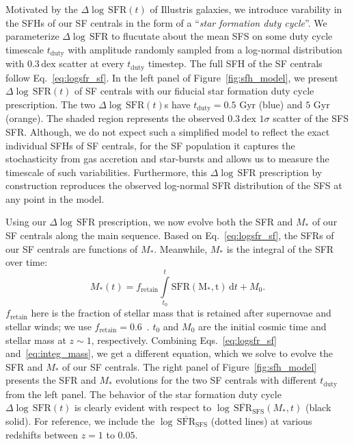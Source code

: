 \documentclass[12pt, letterpaper, preprint]{aastex}
\newcommand{\beq}{\begin{equation}}
\newcommand{\eeq}{\end{equation}}
\newcommand{\logsfr}{\log \, \mathrm{SFR}}
\newcommand{\musfms}{\log\,\overline{\mathrm{SFR}}_\mathrm{SFS}}
\begin{document}
Motivated by the $\Delta \logsfr(t)$ of Illustris galaxies, we introduce 
varability in the SFHs of our SF centrals in the form of a ``\emph{star 
formation duty cycle}''. We parameterize $\Delta \logsfr$ to flucutate about 
the mean SFS on some duty cycle timescale $t_\mathrm{duty}$ with amplitude
randomly sampled from a log-normal distribution with $0.3\,\mathrm{dex}$ 
scatter at every $t_\mathrm{duty}$ timestep. The full SFH of the SF 
centrals follow Eq.~\ref{eq:logsfr_sf}.
In the left panel of Figure~\ref{fig:sfh_model}, we 
present $\Delta \logsfr(t)$ of SF centrals with our fiducial star formation 
duty cycle prescription. The two $\Delta \logsfr(t)$s have $t_\mathrm{duty} = 0.5$ 
Gyr (blue) and $5$ Gyr (orange). The shaded region represents the observed 
$0.3\,\mathrm{dex}$ $1\sigma$ scatter of the SFS SFR. 
Although, we do not expect such a simplified model to reflect the exact 
individual SFHs of SF centrals, for the SF population it captures the 
stochasticity from gas accretion and star-bursts and allows us to measure
the timescale of such variabilities. Furthermore, this $\Delta \logsfr$ 
prescription by construction reproduces the observed log-normal SFR 
distribution of the SFS at any point in the model. 

Using our $\Delta \logsfr$ prescription, we now evolve both the SFR and $M_*$ 
of our SF centrals along the main sequence. Based on Eq.~\ref{eq:logsfr_sf},
the SFRs of our SF centrals are functions of $M_*$. Meanwhile, $M_*$ is the
integral of the SFR over time: 
\beq \label{eq:integ_mass} 
M_*(t) = f_\mathrm{retain} \int\limits_{t_0}^{t} \mathrm{SFR(M_*, t)}\,\mathrm{d}t + M_0. 
\eeq
$f_\mathrm{retain}$ here is the fraction of stellar mass that is retained after 
supernovae and stellar winds; we use $f_\mathrm{retain} = 0.6$~\citep{wetzel2013}. 
$t_0$ and $M_0$ are the initial cosmic time and stellar mass at $z \sim 1$, respectively. 
Combining Eqs.~\ref{eq:logsfr_sf} and~\ref{eq:integ_mass}, we get a different 
equation, which we solve to evolve the SFR and $M_*$ of our SF centrals.  
The right panel of Figure~\ref{fig:sfh_model} presents the SFR and $M_*$ 
evolutions for the two SF centrals with different $t_\mathrm{duty}$ from the
left panel. The behavior of the star formation duty cycle $\Delta \logsfr(t)$ 
is clearly evident with respect to $\musfms(M_*, t)$ (black solid). 
For reference, we include the $\musfms$ (dotted lines) at various redshifts 
between $z = 1$ to $0.05$. 
\end{document}
